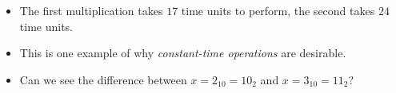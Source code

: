 \begin{frame}
  \begin{remark}
    \begin{itemize}
      \item The first multiplication takes \(17\) time units to perform,
        the second takes \(24\) time units.

      \item This is one example of why \emph{constant-time operations} are 
        desirable.
    \end{itemize}
  \end{remark}

  \pause

  \begin{exercise}
    \begin{itemize}
      \item Can we see the difference between \(x = 2_{10} = 10_2\) and \(x = 
          3_{10} = 11_2\)?
    \end{itemize}
  \end{exercise}
\end{frame}


